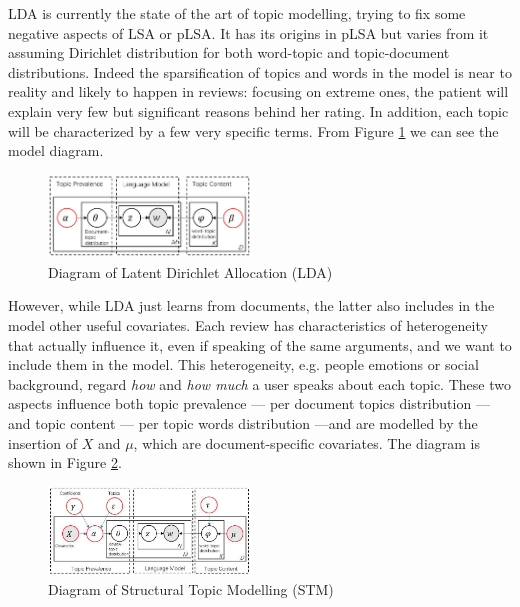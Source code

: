 \documentclass[10pt, a4paper, twocolumn]{article}
\begin{document}
            LDA is currently the state of the art of topic modelling, trying to fix some negative aspects of LSA or pLSA. It has its origins in pLSA but varies from it assuming Dirichlet distribution for both word-topic and topic-document distributions. Indeed the sparsification of topics and words in the model is near to reality and likely to happen in reviews: focusing on extreme ones, the patient will explain very few but significant reasons behind her rating. In addition, each topic will be characterized by a few very specific terms. From Figure \ref{fig:lda_diagram} we can see the model diagram. 
            
            \begin{figure}[!ht]
                \centering
                \includegraphics[width = 0.48\textwidth]{LDA_diagram.png}
                \caption{Diagram of Latent Dirichlet Allocation (LDA)}
                \label{fig:lda_diagram}
            \end{figure}

            However, while LDA just learns from documents, the latter also includes in the model other useful covariates. Each review has characteristics of heterogeneity that actually influence it, even if speaking of the same arguments, and we want to include them in the model. This heterogeneity, e.g. people emotions or social background, regard \emph{how} and \emph{how much} a user speaks about each topic. These two aspects influence both topic prevalence --- per document topics distribution --- and topic content --- per topic words distribution ---and are modelled by the insertion of $X$ and $\mu$, which are document-specific covariates. The diagram is shown in Figure \ref{fig:stm_diagram}.
            
            \begin{figure}[!ht]
                \centering
                \includegraphics[width = 0.48\textwidth]{STM_diagram.png}
                \caption{Diagram of Structural Topic Modelling (STM)}
                \label{fig:stm_diagram}
            \end{figure}
\end{document}
